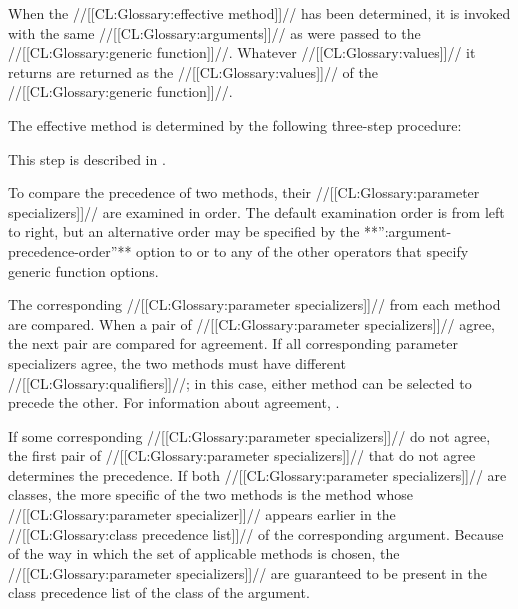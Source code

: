 When the //[[CL:Glossary:effective method]]// has been determined,
it is invoked with the same //[[CL:Glossary:arguments]]// as were passed to the //[[CL:Glossary:generic function]]//.  
Whatever //[[CL:Glossary:values]]// it returns are returned as the //[[CL:Glossary:values]]//
of the //[[CL:Glossary:generic function]]//.


The effective method is determined by the following three-step procedure:

\beginlist




\endlist


This step is described in \secref\IntroToMethods.

\endsubsubsubsection%


To compare the precedence of two methods, their //[[CL:Glossary:parameter specializers]]//
are examined in order.  The default examination order is from left to
right, but an alternative order may be specified by the 
**'':argument-precedence-order''** option to  or to any of
the other operators that specify generic function options.

The corresponding //[[CL:Glossary:parameter specializers]]// from each method are
compared.  When a pair of //[[CL:Glossary:parameter specializers]]// agree, the next
pair are compared for agreement.  If all corresponding parameter
specializers agree, the two methods must have different
//[[CL:Glossary:qualifiers]]//; in this case, either method can be selected to precede the
other.  For information about agreement, \seesection\SpecializerQualifierAgreement.

If some corresponding //[[CL:Glossary:parameter specializers]]// do not agree, the first
pair of //[[CL:Glossary:parameter specializers]]// that do not agree determines the
precedence.  If both //[[CL:Glossary:parameter specializers]]// are classes, the more
specific of the two methods is the method whose //[[CL:Glossary:parameter specializer]]//
appears earlier in the //[[CL:Glossary:class precedence list]]// of the corresponding
argument.  Because of the way in which the set of applicable methods
is chosen, the //[[CL:Glossary:parameter specializers]]// are guaranteed to be present in
the class precedence list of the class of the argument.

